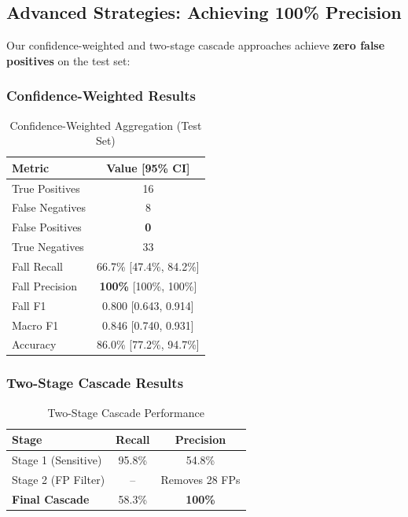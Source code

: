 \documentclass[conference]{IEEEtran}
\begin{document}
\subsection{Advanced Strategies: Achieving 100\% Precision}

Our confidence-weighted and two-stage cascade approaches achieve \textbf{zero false positives} on the test set:

\subsubsection{Confidence-Weighted Results}

\begin{table}[H]
\centering
\caption{Confidence-Weighted Aggregation (Test Set)}
\label{tab:confidence_results}
\begin{tabular}{lc}
\toprule
\textbf{Metric} & \textbf{Value [95\% CI]} \\
\midrule
True Positives & 16 \\
False Negatives & 8 \\
False Positives & \textbf{0} \\
True Negatives & 33 \\
\midrule
Fall Recall & 66.7\% [47.4\%, 84.2\%] \\
Fall Precision & \textbf{100\%} [100\%, 100\%] \\
Fall F1 & 0.800 [0.643, 0.914] \\
Macro F1 & 0.846 [0.740, 0.931] \\
Accuracy & 86.0\% [77.2\%, 94.7\%] \\
\bottomrule
\end{tabular}
\end{table}

\subsubsection{Two-Stage Cascade Results}

\begin{table}[H]
\centering
\caption{Two-Stage Cascade Performance}
\label{tab:cascade_results}
\begin{tabular}{lcc}
\toprule
\textbf{Stage} & \textbf{Recall} & \textbf{Precision} \\
\midrule
Stage 1 (Sensitive) & 95.8\% & 54.8\% \\
Stage 2 (FP Filter) & -- & Removes 28 FPs \\
\midrule
\textbf{Final Cascade} & 58.3\% & \textbf{100\%} \\
\bottomrule
\end{tabular}
\end{table}
\end{document}
